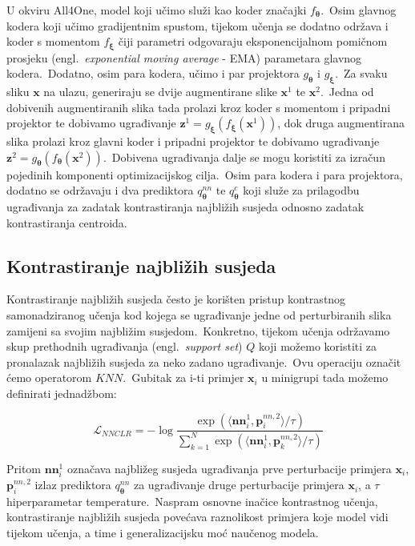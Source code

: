 \documentclass[diplomskirad]{fer}
\begin{document}
U okviru All4One, model koji učimo služi kao koder značajki $f_{\bm{\theta}}$.\ Osim glavnog kodera koji učimo gradijentnim spustom, tijekom učenja se dodatno održava i koder s momentom $f_{\bm{\xi}}$ čiji parametri odgovaraju eksponencijalnom pomičnom prosjeku (engl.\ \textit{exponential moving average} - EMA) parametara glavnog kodera.\
Dodatno, osim para kodera, učimo i par projektora $g_{\bm{\theta}}$ i $g_{\bm{\xi}}$.\ Za svaku sliku $\bm{x}$ na ulazu, generiraju se dvije augmentirane slike $\bm{x}^1$ te $\bm{x}^2$.\ 
Jedna od dobivenih augmentiranih slika tada prolazi kroz koder s momentom i pripadni projektor te dobivamo ugrađivanje $\bm{z}^1 = g_{\bm{\xi}}(f_{\bm{\xi}}(\bm{x}^1))$, dok druga augmentirana slika prolazi kroz glavni koder i pripadni projektor te dobivamo ugrađivanje $\bm{z}^2 = g_{\bm{\theta}}(f_{\bm{\theta}}(\bm{x}^2))$.\
Dobivena ugrađivanja dalje se mogu koristiti za izračun pojedinih komponenti optimizacijskog cilja.\ Osim para kodera i para projektora, dodatno se održavaju i dva prediktora $q_{\bm{\theta}}^{nn}$ te $q_{\bm{\theta}}^{c}$ koji služe za prilagodbu ugrađivanja za zadatak kontrastiranja najbližih susjeda odnosno zadatak kontrastiranja centroida.\

\subsection{Kontrastiranje najbližih susjeda}
\label{sub:knn}

Kontrastiranje najbližih susjeda često je korišten pristup kontrastnog samonadziranog učenja kod kojega se ugrađivanje jedne od perturbiranih slika zamijeni sa svojim najbližim susjedom.\ 
Konkretno, tijekom učenja održavamo skup prethodnih ugrađivanja (engl.\ \textit{support set}) $Q$ koji možemo koristiti za pronalazak najbližih susjeda za neko zadano ugrađivanje.\ Ovu operaciju označit ćemo operatorom $KNN$.\ 
Gubitak za i-ti primjer $\bm{x}_i$ u minigrupi tada možemo definirati jednadžbom:

\begin{equation}
  \mathcal{L}_{NNCLR} = - \log{\frac{\exp(\langle \bm{nn}_{i}^{1}, \bm{p}_{i}^{nn, 2} \rangle / \tau)}{\sum_{k=1}^{N}{\exp(\langle \bm{nn}_{i}^{1}, \bm{p}_{k}^{nn, 2} \rangle / \tau)}}}
  \label{eq:NNCLR_loss}
\end{equation}

Pritom $\bm{nn}_{i}^{1}$ označava najbližeg susjeda ugrađivanja prve perturbacije primjera $\bm{x}_i$, $\bm{p}_{i}^{nn, 2}$ izlaz prediktora $q_{\bm{\theta}}^{nn}$ za ugrađivanje druge perturbacije primjera $\bm{x}_i$, a $\tau$ hiperparametar temperature.\ 
Naspram osnovne inačice kontrastnog učenja, kontrastiranje najbližih susjeda povećava raznolikost primjera koje model vidi tijekom učenja, a time i generalizacijsku moć naučenog modela.\ 
\end{document}
